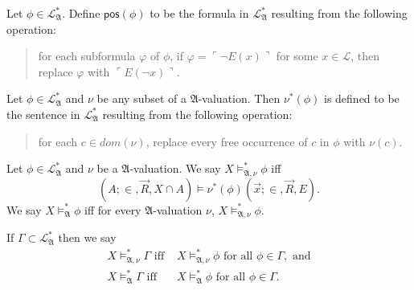 \documentclass[12pt]{article}
\numberwithin{equation}{section}
\begin{document}
\begin{defi}
Let $\phi\in \mathcal{L}^{*}_{\mathfrak{A}}$. Define $\mathsf{pos}(\phi)$ to be the formula in $\mathcal{L}^{*}_{\mathfrak{A}}$ resulting from the following operation: 
\begin{quote}
    for each subformula $\varphi$ of $\phi$, if $\varphi = \ulcorner \neg E(x) \urcorner$ for some $x \in \mathcal{L}$, then replace $\varphi$ with $\ulcorner E(\neg x) \urcorner$.
\end{quote}
\end{defi}

\begin{defi}
Let $\phi\in \mathcal{L}^{*}_{\mathfrak{A}}$ and $\nu$ be any subset of a $\mathfrak{A}$-valuation. Then $\nu^*(\phi)$ is defined to be the sentence in $\mathcal{L}^{*}_{\mathfrak{A}}$ resulting from the following operation:
\begin{quote}
for each $c \in dom(\nu)$, replace every free occurrence of $c$ in $\phi$ with $\nu(c)$.
\end{quote}
\end{defi}

\begin{defi}\label{models}
Let $\phi \in \mathcal{L}^{*}_{\mathfrak{A}}$ and $\nu$ be a $\mathfrak{A}$-valuation. We say $X \models^*_{\mathfrak{A}, \nu} \phi$ iff $$(A; \in, \Vec{R}, X \cap A) \models \nu^*(\phi)(\Vec{x}; \in, \Vec{R}, E).$$ 
We say $X \models^*_{\mathfrak{A}} \phi$ iff for every $\mathfrak{A}$-valuation $\nu$, $X \models^*_{\mathfrak{A}, \nu} \phi$.

If $\Gamma \subset \mathcal{L}^*_{\mathfrak{A}}$ then we say
\begin{align*}
    X \models^*_{\mathfrak{A}, \nu} \Gamma \text{ iff } & X \models^*_{\mathfrak{A}, \nu} \phi \text{ for all } \phi \in \Gamma, \text{ and} \\ 
    X \models^*_{\mathfrak{A}} \Gamma \text{ iff } & X \models^*_{\mathfrak{A}} \phi \text{ for all } \phi \in \Gamma.
\end{align*}
\end{defi}
\end{document}

